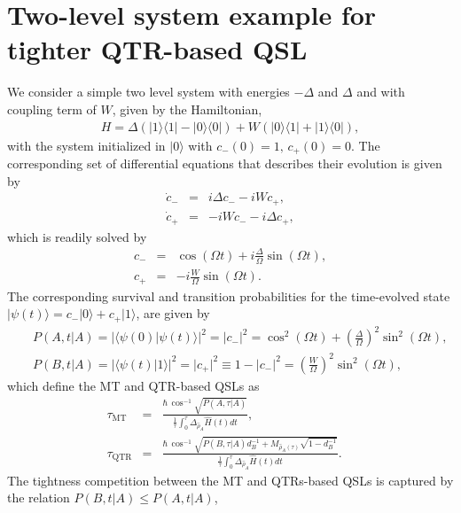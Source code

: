 \documentclass[prl,aps,amssymb,twocolumn,superscriptaddress, notitlepage, longbibliography]{revtex4-2}
\begin{document}
\section{Two-level system example for tighter QTR-based QSL}
We consider a simple two level system with energies $-\Delta$ and $\Delta$ and with coupling term of $W$, given by the Hamiltonian,
\begin{eqnarray}
    H=\Delta\left(\lvert 1\rangle\langle 1\rvert-\lvert 0\rangle\langle 0\rvert\right)+W\left(\lvert 0\rangle\langle 1\rvert+\lvert 1\rangle\langle 0\rvert\right),
\end{eqnarray}
with the system initialized in $\lvert 0\rangle$ with $c_-(0)=1,\,c_+(0)=0$. The corresponding set of differential equations that describes their evolution is given by
\begin{eqnarray}
    \dot c_-&=&i\Delta c_--iW c_+,\\
    \dot c_+&=&-iWc_--i\Delta c_+,
\end{eqnarray}
which is readily solved by
\begin{eqnarray}
    c_-&=&\cos\left(\Omega t\right)+i\frac{\Delta}{\Omega}\sin\left(\Omega t\right),\\
    c_+&=&-i\frac{W}{\Omega}\sin\left(\Omega t\right).
\end{eqnarray}
The corresponding survival and transition probabilities for the time-evolved state $\lvert\psi(t)\rangle=c_-\lvert0\rangle+c_+\lvert1\rangle$, are given by
\begin{eqnarray}
    &&P(A,t\vert A)=\lvert\langle\psi(0)\vert\psi(t)\rangle\rvert^2=\lvert c_-\rvert^2=\cos^2(\Omega t)+\left(\frac{\Delta}{\Omega}\right)^2\sin^2(\Omega t),\\
    &&P(B,t\vert A)=\lvert\langle\psi(t)\vert1\rangle\rvert^2=\lvert c_+\rvert^2\equiv 1-\lvert c_-\rvert^2=\left(\frac{W}{\Omega}\right)^2\sin^2(\Omega t),
\end{eqnarray}
which define the MT and QTR-based QSLs as
\begin{eqnarray}
    \tau_\mathrm{MT}&\!=\!&\frac{\hbar \,\cos^{-1}\sqrt{P(A,\tau|A)}}{\frac{1}{\tau}\int_0^\tau \Delta_{\hat{\rho}_A} \hat H(t) dt},\\
    \tau_\mathrm{QTR}&\!=\!&\frac{\hbar \,\cos^{-1}\sqrt{P(B,\tau|A)d^{-1}_B+M_{\hat\rho_A(\tau)}\sqrt{1-d^{-1}_B}}}{\frac{1}{\tau}\int_0^\tau \Delta_{\hat{\rho}_A} \hat H(t) dt}.\quad
\end{eqnarray}
The tightness competition between the MT and QTRs-based QSLs is captured by the relation $P(B,t\vert A)\leq P(A,t\vert A)$,
\end{document}
